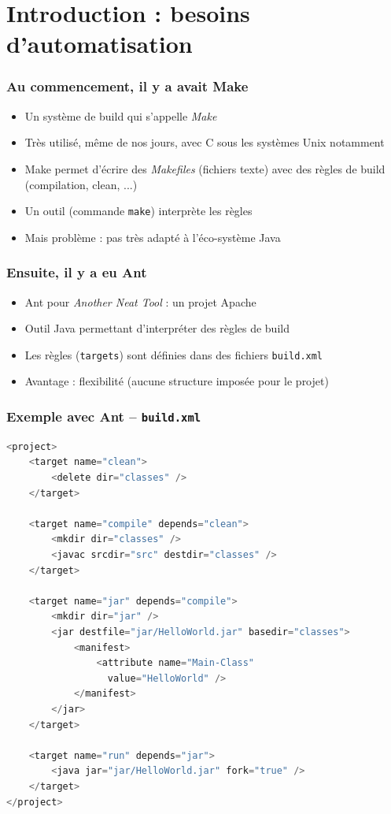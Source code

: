 \documentclass{beamer}
\begin{document}

\section{Introduction : besoins d'automatisation}

\begin{frame}[fragile]
  \frametitle{Au commencement, il y a avait Make}
\begin{itemize}
\item Un système de build qui s'appelle \textit{Make}
\item Très utilisé, même de nos jours, avec C sous les systèmes Unix
  notamment
\item Make permet d'écrire des \textit{Makefiles} (fichiers texte)
  avec des règles de build (compilation, clean, ...)
\item Un outil (commande \texttt{make}) interprète les règles
\item Mais problème : pas très adapté à l'éco-système Java
\end{itemize}
\end{frame}

\begin{frame}[fragile]
  \frametitle{Ensuite, il y a eu Ant}
\begin{itemize}
\item Ant pour \textit{Another Neat Tool} : un projet Apache
\item Outil Java permettant d'interpréter des règles de build
\item Les règles (\texttt{targets}) sont définies dans des fichiers
  \texttt{build.xml}
\item Avantage : flexibilité (aucune structure imposée pour le projet)
\end{itemize}
\end{frame}

\begin{frame}[fragile]
  \frametitle{Exemple avec Ant -- \texttt{build.xml}}
\begin{lstlisting}[language=Java,basicstyle=\tiny]
<project>
    <target name="clean">
        <delete dir="classes" />
    </target>
 
    <target name="compile" depends="clean">
        <mkdir dir="classes" />
        <javac srcdir="src" destdir="classes" />
    </target>
 
    <target name="jar" depends="compile">
        <mkdir dir="jar" />
        <jar destfile="jar/HelloWorld.jar" basedir="classes">
            <manifest>
                <attribute name="Main-Class"
                  value="HelloWorld" />
            </manifest>
        </jar>
    </target>
 
    <target name="run" depends="jar">
        <java jar="jar/HelloWorld.jar" fork="true" />
    </target>
</project>
\end{lstlisting}

\end{frame}
\end{document}
